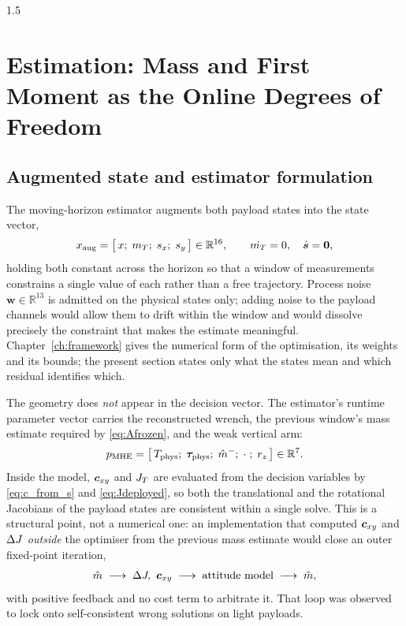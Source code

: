\begin{spacing}{1.5}
\section{Estimation: Mass and First Moment as the Online Degrees of Freedom}\label{sec:model:mhe}

\subsection{Augmented state and estimator formulation}\label{sec:model:mheform}

The moving-horizon estimator augments both payload states into the state vector,
\begin{equation}
x_{\mathrm{aug}} = \bigl[\,x;\; m_T;\; s_x;\; s_y\,\bigr] \in \mathbb{R}^{16},
\qquad \dot{m_T} = 0, \quad \dot{\bm{s}}=\bm{0},
\label{eq:xaug}
\end{equation}
holding both constant across the horizon so that a window of measurements
constrains a single value of each rather than a free trajectory. Process noise
$\bm{w} \in \mathbb{R}^{13}$ is admitted on the physical states only; adding
noise to the payload channels would allow them to drift within the window and
would dissolve precisely the constraint that makes the estimate meaningful.
Chapter~\ref{ch:framework} gives the numerical form of the optimisation, its
weights and its bounds; the present section states only what the states mean and
which residual identifies which.

The geometry does \emph{not} appear in the decision vector. The estimator's
runtime parameter vector carries the reconstructed wrench, the previous window's
mass estimate required by \eqref{eq:Afrozen}, and the weak vertical arm:
\begin{equation}
p_{\mathrm{MHE}} = \bigl[\, T_{\mathrm{phys}};\; \bm{\tau}_{\mathrm{phys}};\; \hat m^{-};\; \cdot\;;\; r_z \,\bigr] \in \mathbb{R}^{7}.
\label{eq:pmhe}
\end{equation}
Inside the model, $\bm{c}_{xy}$ and $J_T$ are evaluated from the decision variables by
\eqref{eq:c_from_s} and \eqref{eq:Jdeployed}, so both the translational and the
rotational Jacobians of the payload states are consistent within a single solve.
This is a structural point, not a numerical one: an implementation that computed
$\bm{c}_{xy}$ and $\Delta J$ \emph{outside} the optimiser from the previous mass estimate
would close an outer fixed-point iteration,
\begin{equation*}
\hat m \;\longrightarrow\; \Delta J,\ \bm{c}_{xy}
\;\longrightarrow\; \text{attitude model}
\;\longrightarrow\; \hat m ,
\end{equation*}
with positive feedback and no cost term to arbitrate it. That loop was observed
to lock onto self-consistent wrong solutions on light payloads.


\end{spacing}
